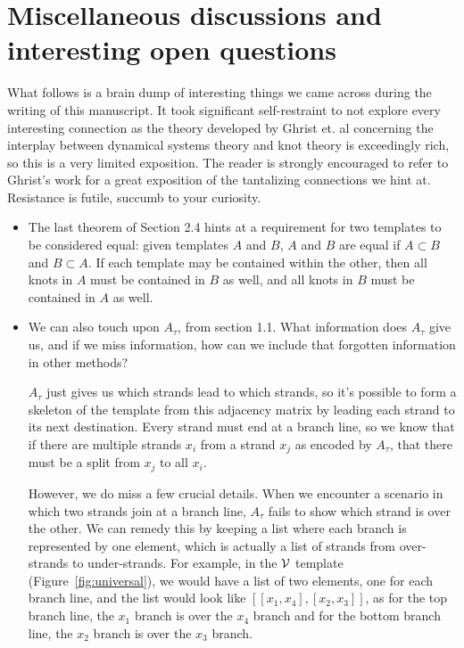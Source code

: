 \documentclass[paper.tex]{subfiles}
\begin{document}
\section{Miscellaneous discussions and interesting open questions}
\label{sec:misc}

What follows is a brain dump of interesting things we came across during the writing of this manuscript. It took
significant self-restraint to not explore every interesting connection as the theory developed by Ghrist et. al concerning the interplay between dynamical systems theory and knot theory is exceedingly rich, so this
is a very limited exposition. The reader is strongly encouraged to refer to Ghrist's work for a great exposition of the tantalizing connections we hint at. Resistance is futile, succumb to your curiosity.


\begin{itemize}
       \item  The last theorem of Section 2.4 hints at a requirement for two templates to be considered equal: given templates $A$ and $B$, $A$ and $B$ are equal if $A \subset B$ and $B \subset A$. If each template may be contained within the other, then all knots in $A$ must be contained in $B$ as well, and all knots in $B$ must be contained in $A$ as well.


   \item We can also touch upon $A_\tau$, from section 1.1. What information does $A_\tau$ give us, and if we miss information, how can we include that forgotten information in other methods?

       $A_\tau$ just gives us which strands lead to which strands, so it's possible to form a skeleton of the template from this adjacency matrix by leading each strand to its next destination. Every strand must end at a branch line, so we know that if there are multiple strands $x_i$ from a strand $x_j$ as encoded by $A_\tau$, that there must be a split from $x_j$ to all $x_i$.

       However, we do miss a few crucial details. When we encounter a scenario in which two strands join at a branch line, $A_\tau$ fails to show which strand is over the other. We can remedy this by keeping a list where each branch is represented by one element, which is actually a list of strands from over-strands to under-strands. For example, in the $\mathcal{V}$ template (Figure~\ref{fig:universal}), we would have a list of two elements, one for each branch line, and the list would look like $[[x_1, x_4], [x_2, x_3]]$, as for the top branch line, the $x_1$ branch is over the $x_4$ branch and for the bottom branch line, the $x_2$ branch is over the $x_3$ branch.


\end{itemize}
\end{document}
